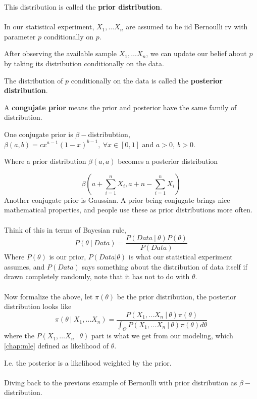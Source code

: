 \documentclass{article}
\begin{document}
This distribution is called the \textbf{prior distribution}.
\\
\\
In our statistical experiment, $X_1, \dots X_n$ are assumed to be iid Bernoulli rv with parameter $p$ conditionally on $p$.

After observing the available sample $X_1, \dots X_n$, we can update our belief about $p$ by taking its distribution conditionally on the data.

The distribution of $p$ conditionally on the data is called the \textbf{posterior distribution}.

A \textbf{congujate prior} means the prior and posterior have the same family of distribution.

One conjugate prior is $\beta-$distribubtion, $\beta(a, b) = c x^{a - 1} (1 - x)^{b - 1}, ~ \forall x \in [0, 1]$ and $a > 0, ~ b > 0$.

Where a prior distribution $\beta(a, a)$ becomes a posterior distribution

$$
\beta(a + \sum_{i = 1}^{n} X_i, a + n - \sum_{i = 1}^{n} X_i)
$$
Another conjugate prior is Gaussian.
A prior being conjugate brings nice mathematical properties, and people use these as prior distributions more often.
\\
\\

Think of this in terms of Bayesian rule,
$$
P(\theta ~ | ~ Data) = \frac{P(Data ~ | ~ \theta) P(\theta)}{P(Data)}
$$
Where $P(\theta)$ is our prior, $P(Data | \theta)$ is what our statistical experiment assumes,
and $P(Data)$ says something about the distribution of data itself if drawn completely randomly,
note that it has not to do with $\theta$.
\\
\\

Now formalize the above, let $\pi(\theta)$ be the prior distribution,
the posterior distribution looks like
$$
\pi(\theta ~ | ~ X_1, \dots X_n) = \frac{P(X_1, \dots X_n ~ | ~ \theta) \pi(\theta)}{\int_{\Theta} P(X_1, \dots X_n ~ | ~ \theta) \pi(\theta) d\theta}
$$
where the $P(X_1, \dots X_n ~ | ~ \theta)$ part is what we get from our modeling,
which \ref{chap:mle} defined as likelihood of $\theta$.

I.e. the posterior is a likelihood weighted by the prior.
\\
\\

Diving back to the previous example of Bernoulli with prior distribution as $\beta-$distribution.
\end{document}
